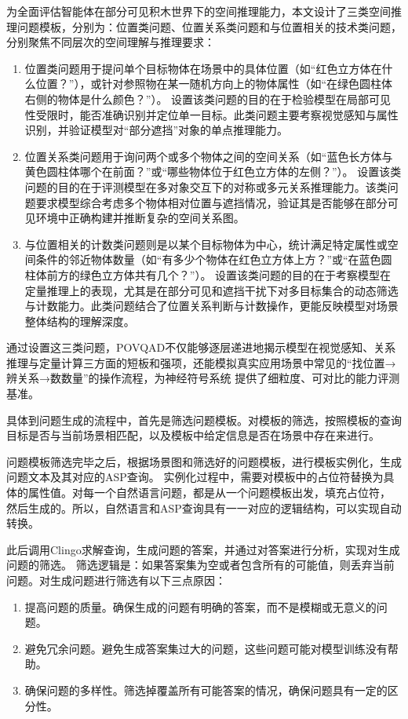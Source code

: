 为全面评估智能体在部分可见积木世界下的空间推理能力，本文设计了三类空间推理问题模板，分别为：位置类问题、位置关系类问题和与位置相关的技术类问题，
分别聚焦不同层次的空间理解与推理要求：
\begin{enumerate}[nosep]
\item 位置类问题用于提问单个目标物体在场景中的具体位置（如“红色立方体在什么位置？”\-），或针对参照物在某一随机方向上的物体属性（如“在绿色圆柱体右侧的物体是什么颜色？”）。
设置该类问题的目的在于检验模型在局部可见性受限时，能否准确识别并定位单一目标。此类问题主要考察视觉感知与属性识别，并验证模型对“部分遮挡”对象的单点推理能力。
\item 位置关系类问题用于询问两个或多个物体之间的空间关系（如“蓝色长方体与黄色圆柱体哪个在前面？”或“哪些物体位于红色立方体的左侧？”）。
设置该类问题的目的在于评测模型在多对象交互下的对称或多元关系推理能力。该类问题要求模型综合考虑多个物体相对位置与遮挡情况，验证其是否能够在部分可见环境中正确构建并推断复杂的空间关系图。
\item 与位置相关的计数类问题则是以某个目标物体为中心，统计满足特定属性或空间条件的邻近物体数量（如“有多少个物体在红色立方体上方？”或“在蓝色圆柱体前方的绿色立方体共有几个？”）。
设置该类问题的目的在于考察模型在定量推理上的表现，尤其是在部分可见和遮挡干扰下对多目标集合的动态筛选与计数能力。此类问题结合了位置关系判断与计数操作，更能反映模型对场景整体结构的理解深度。
\end{enumerate}
通过设置这三类问题，POVQAD不仅能够逐层递进地揭示模型在视觉感知、关系推理与定量计算三方面的短板和强项，还能模拟真实应用场景中常见的“找位置→辨关系→数数量”的操作流程，为神经符号系统
提供了细粒度、可对比的能力评测基准。

具体到问题生成的流程中，首先是筛选问题模板。对模板的筛选，按照模板的查询目标是否与当前场景相匹配，以及模板中给定信息是否在场景中存在来进行。

问题模板筛选完毕之后，根据场景图和筛选好的问题模板，进行模板实例化，生成问题文本及其对应的ASP查询。
实例化过程中，需要对模板中的占位符替换为具体的属性值。对每一个自然语言问题，都是从一个问题模板出发，填充占位符，
然后生成的。所以，自然语言和ASP查询具有一一对应的逻辑结构，可以实现自动转换。

此后调用Clingo求解查询，生成问题的答案，并通过对答案进行分析，实现对生成问题的筛选。
筛选逻辑是：如果答案集为空或者包含所有的可能值，则丢弃当前问题。对生成问题进行筛选有以下三点原因：
\begin{enumerate}[nosep]
\item 提高问题的质量。确保生成的问题有明确的答案，而不是模糊或无意义的问题。
\item 避免冗余问题。避免生成答案集过大的问题，这些问题可能对模型训练没有帮助。
\item 确保问题的多样性。筛选掉覆盖所有可能答案的情况，确保问题具有一定的区分性。
\end{enumerate}

